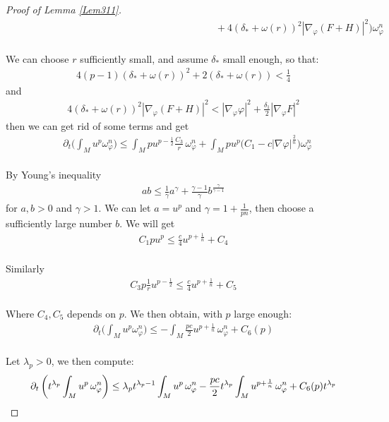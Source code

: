 \documentclass[11pt]{amsart}
\numberwithin{equation}{section}
\begin{document}
\begin{proof}[Proof of Lemma \ref{Lem311}]
\begin{align}
	&\qquad\qquad\qquad\qquad\qquad\qquad\qquad\qquad\qquad\qquad  +4(\delta_* + \omega(r))^2 |\nabla_{\varphi} (F+H)|^2  \bigg) \omega_\varphi^n 
\end{align}\\
We can choose $r$ sufficiently small, and assume $\delta_*$ small enough, so that:
\begin{align}
	4(p - 1)(\delta_* + \omega(r))^2 + 2(\delta_* + \omega(r)) < \frac{1}{4}
\end{align}
and 
\begin{align}
	4(\delta_* + \omega(r))^2 |\nabla_{\varphi} (F+H)|^2 < |\nabla_\varphi\varphi|^2 + \frac{\delta_1}{2} |\nabla_\varphi F|^2 
\end{align}
then we can get rid of some terms and get 
\begin{align}
	&\partial_t\big( \int_M u^p\omega_\varphi^n\big)\le   \int_M p u^{p-\frac{1}{2}} \frac{C_{3}}{r} \, \omega_{\varphi}^n +\int_M pu^{p} \big(C_1 - c|\nabla\varphi|^{\frac{2}{n}} \big) \omega_\varphi^n 
\end{align}\\
By Young's inequality
\begin{align}
	ab\le  \frac{1}{\gamma}a^\gamma+\frac{\gamma-1}{\gamma}b^{\frac{\gamma}{\gamma-1}}
\end{align}
for $a,b>0$ and $\gamma>1$. We can let $a=u^p$ and $\gamma=1+\frac{1}{pn}$, then choose a sufficiently large number $b$. We will get 
\begin{align}
	C_1 p u^p\le  \frac{c}{4}u^{p+\frac{1}{n}}+C_4 
\end{align}\\
Similarly  
\begin{align}
	C_3 p \frac{1}{r} u^{p-\frac{1}{2}}\le  \frac{c}{4}u^{p+\frac{1}{n}}+C_5
\end{align}\\
Where $C_4, C_5$ depends on $p$. We then obtain, with \( p \) large enough:
\begin{align}
	\partial_t\big( \int_M u^p \omega_{\varphi}^n \big) \le  - \int_M \frac{pc}{2} u^{p + \frac{1}{n}} \, \omega_{\varphi}^n + C_{6}(p)
\end{align}\\
Let \( \lambda_p > 0 \), we then compute:
\begin{align}
	\partial_t \left( t^{\lambda_p} \int_M u^p \, \omega_{\varphi}^n \right) \le  \lambda_p t^{\lambda_p - 1} \int_M u^p \, \omega_{\varphi}^n - \frac{pc}{2} t^{\lambda_p} \int_M u^{p + \frac{1}{n}} \, \omega_{\varphi}^n + C_{6}(p) t^{\lambda_p} \notag \\

\end{align}
\end{proof}
\end{document}
